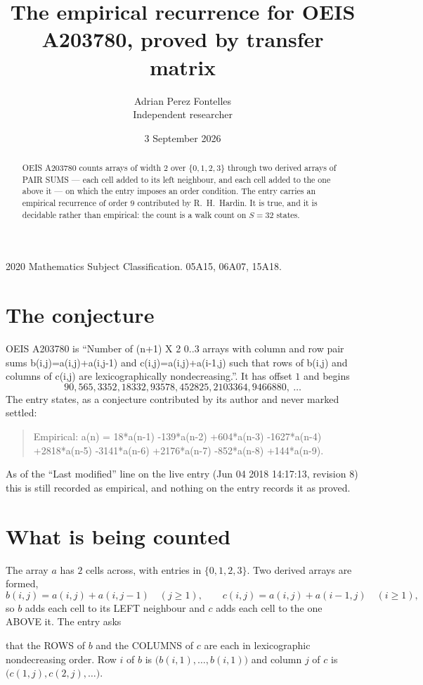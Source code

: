 \documentclass[11pt,a4paper]{article}
\title{The empirical recurrence for OEIS A203780, proved by transfer matrix}
\author{Adrian Perez Fontelles\\ \small Independent researcher}
\date{3 September 2026}
\theoremstyle{plain}
\theoremstyle{definition}
\begin{document}
\maketitle

\begin{abstract}
OEIS A203780 counts arrays of width $2$ over $\{0,1,2,3\}$ through two derived arrays of PAIR SUMS ---
each cell added to its left neighbour, and each cell added to the one above it --- on which the
entry imposes an order condition. The entry carries an empirical recurrence of order $9$
contributed by R.~H.~Hardin. It is true, and it is decidable rather than empirical: the count is
a walk count on $S=32$ states.
\end{abstract}

\noindent\small 2020 Mathematics Subject Classification. 05A15, 06A07, 15A18.\normalsize

\section{The conjecture}

OEIS A203780 is ``Number of (n+1) X 2 0..3 arrays with column and row pair sums b(i,j)=a(i,j)+a(i,j-1) and c(i,j)=a(i,j)+a(i-1,j) such that rows of b(i,j) and columns of c(i,j) are lexicographically nondecreasing.''. It has offset $1$ and begins
\[
90, 565, 3352, 18332, 93578, 452825, 2103364, 9466880,\ \dots
\]
The entry states, as a conjecture contributed by its author and never marked settled:
\begin{quote}
Empirical: a(n) = 18*a(n-1) -139*a(n-2) +604*a(n-3) -1627*a(n-4) +2818*a(n-5) -3141*a(n-6) +2176*a(n-7) -852*a(n-8) +144*a(n-9).
\end{quote}
As of the ``Last modified'' line on the live entry (Jun 04 2018 14:17:13, revision 8) this is still
recorded as empirical, and nothing on the entry records it as proved.

\section{What is being counted}

The array $a$ has $2$ cells across, with entries in $\{0,1,2,3\}$. Two derived arrays are formed,
\[
b(i,j)=a(i,j)+a(i,j-1)\quad(j\ge1),\qquad c(i,j)=a(i,j)+a(i-1,j)\quad(i\ge1),
\]
so $b$ adds each cell to its LEFT neighbour and $c$ adds each cell to the one ABOVE it. The
entry asks

that the ROWS of $b$ and the COLUMNS of $c$ are each in lexicographic nondecreasing order. Row $i$ of $b$
is $\bigl(b(i,1),\dots,b(i,1)\bigr)$ and column $j$ of $c$ is
$\bigl(c(1,j),c(2,j),\dots\bigr)$.
\end{document}
